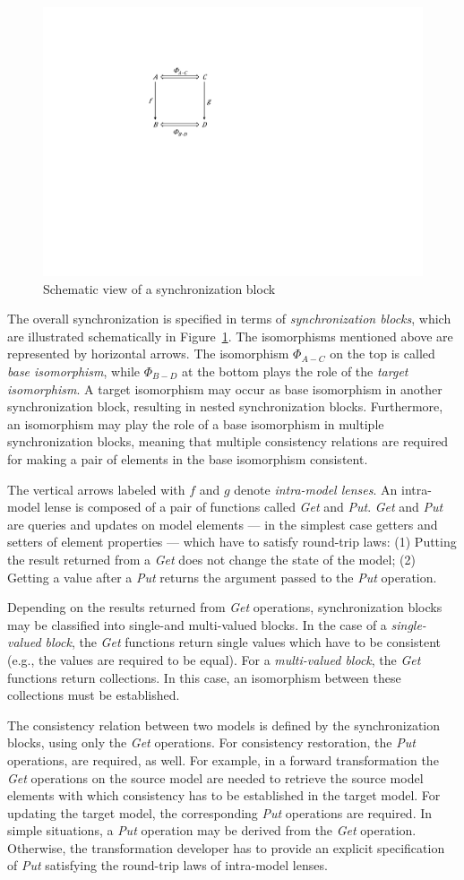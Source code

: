 \begin{figure}[tb!]
	\centering
	\includegraphics[width=0.35\columnwidth]{diagrams/NMFSynchronizationBlock}
	\caption{Schematic view of a synchronization block}
	\label{fig:SynchronizationBlock}
\end{figure}

The overall synchronization is specified in terms of \emph{synchronization blocks}, which are illustrated schematically in Figure~\ref{fig:SynchronizationBlock}. The isomorphisms mentioned above are represented by horizontal arrows. The isomorphism $\varPhi_{A-C}$ on the top is called \emph{base isomorphism}, while $\varPhi_{B-D}$ at the bottom plays the role of the \emph{target isomorphism}. A target isomorphism may occur as base isomorphism in another synchronization block, resulting in nested synchronization blocks. Furthermore, an isomorphism may play the role of a base isomorphism in multiple synchronization blocks, meaning that multiple consistency relations are required for making a pair of elements in the base isomorphism consistent.

The vertical arrows labeled with $f$ and $g$ denote \emph{intra-model lenses}. An intra-model lense is composed of a pair of functions called \emph{Get} and \emph{Put}. \emph{Get} and \emph{Put} are queries and updates on model elements --- in the simplest case getters and setters of element properties --- which have to satisfy round-trip laws: (1) Putting the result returned from a \emph{Get} does not change the state of the model; (2) Getting a value after a \emph{Put} returns the argument passed to the \emph{Put} operation.

Depending on the results returned from \emph{Get} operations, synchronization blocks may be classified into single-and multi-valued blocks. In the case of a \emph{single-valued block}, the \emph{Get} functions return single values which have to be consistent (e.g., the values are required to be equal). For a \emph{multi-valued block}, the \emph{Get} functions return collections. In this case, an isomorphism between these collections must be established.

The consistency relation between two models is defined by the synchronization blocks, using only the \emph{Get} operations. For consistency restoration, the \emph{Put} operations, are required, as well. For example, in a forward transformation the \emph{Get} operations on the source model are needed to retrieve the source model elements with which consistency has to be established in the target model. For updating the target model, the corresponding \emph{Put} operations are required. In simple situations, a \emph{Put} operation may be derived from the \emph{Get} operation. Otherwise, the transformation developer has to provide an explicit specification of \emph{Put} satisfying the round-trip laws of intra-model lenses. 

